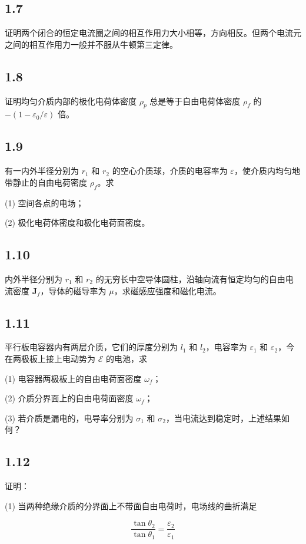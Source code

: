 \newpage
\subsection{1.7}
证明两个闭合的恒定电流圈之间的相互作用力大小相等，方向相反。但两个电流元之间的相互作用力一般并不服从牛顿第三定律。

\newpage
\subsection{1.8}
证明均匀介质内部的极化电荷体密度 $\rho_p$ 总是等于自由电荷体密度 $\rho_f$ 的 $-(1 - \varepsilon_0 / \varepsilon)$ 倍。

\newpage
\subsection{1.9}
有一内外半径分别为 $r_1$ 和 $r_2$ 的空心介质球，介质的电容率为 $\varepsilon$，使介质内均匀地带静止的自由电荷密度 $\rho_f$。求

(1) 空间各点的电场；

(2) 极化电荷体密度和极化电荷面密度。

\newpage
\subsection{1.10}
内外半径分别为 $r_1$ 和 $r_2$ 的无穷长中空导体圆柱，沿轴向流有恒定均匀的自由电流密度 $\boldsymbol{J}_f$，导体的磁导率为 $\mu$，求磁感应强度和磁化电流。

\newpage
\subsection{1.11}
平行板电容器内有两层介质，它们的厚度分别为 $l_1$ 和 $l_2$，电容率为 $\varepsilon_1$ 和 $\varepsilon_2$，今在两极板上接上电动势为 $\mathcal{E}$ 的电池，求

(1) 电容器两极板上的自由电荷面密度 $\omega_f$；

(2) 介质分界面上的自由电荷面密度 $\omega_f$；

(3) 若介质是漏电的，电导率分别为 $\sigma_1$ 和 $\sigma_2$，当电流达到稳定时，上述结果如何？

\newpage
\subsection{1.12}
证明：

(1) 当两种绝缘介质的分界面上不带面自由电荷时，电场线的曲折满足

$$\frac{\tan\theta_2}{\tan\theta_1} = \frac{\varepsilon_2}{\varepsilon_1}$$

